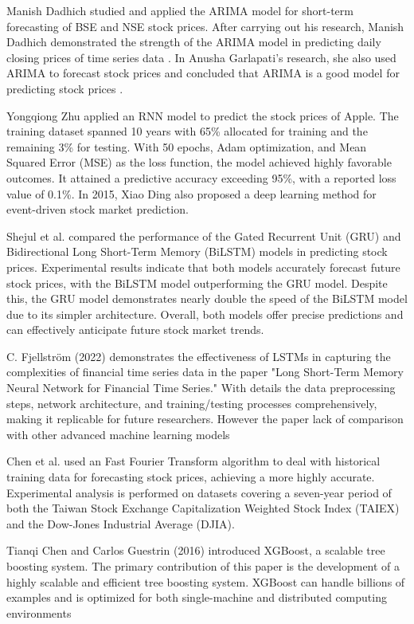 \documentclass{ieeeojies}
\begin{document}
Manish Dadhich studied and applied the ARIMA model for short-term forecasting of BSE and NSE stock prices. After carrying out his research, Manish Dadhich demonstrated the strength of the ARIMA model in predicting daily closing prices of time series data \cite{dadhich2021predictive}. In Anusha Garlapati's research, she also used ARIMA to forecast stock prices and concluded that ARIMA is a good model for predicting stock prices \cite{garlapati2021stock}.

Yongqiong Zhu \cite{ZhuRNN} applied an RNN model to predict the stock prices of Apple. The training dataset spanned 10 years with 65\% allocated for training and the remaining 3\% for testing. With 50 epochs, Adam optimization, and Mean Squared Error (MSE) as the loss function, the model achieved highly favorable outcomes. It attained a predictive accuracy exceeding 95\%, with a reported loss value of 0.1\%. In 2015, Xiao Ding \cite{DingGRU} also proposed a deep learning method for event-driven stock market prediction.

Shejul et al. \cite{ShejulGRU} compared the performance of the Gated Recurrent Unit (GRU) and Bidirectional Long Short-Term Memory (BiLSTM) models in predicting stock prices. Experimental results indicate that both models accurately forecast future stock prices, with the BiLSTM model outperforming the GRU model. Despite this, the GRU model demonstrates nearly double the speed of the BiLSTM model due to its simpler architecture. Overall, both models offer precise predictions and can effectively anticipate future stock market trends.

C. Fjellström (2022) \cite{fjellstrom2022lstm} demonstrates the effectiveness of LSTMs in capturing the complexities of financial time series data in the paper "Long Short-Term Memory Neural Network for Financial Time Series." With details the data preprocessing steps, network architecture, and training/testing processes comprehensively, making it replicable for future researchers. However the paper lack of comparison with other advanced machine learning models

Chen et al.\cite{ChenFFT} used an Fast Fourier Transform algorithm to deal with historical training data for forecasting stock prices, achieving a more highly accurate. Experimental analysis is performed on datasets covering a seven-year period of both the Taiwan Stock Exchange Capitalization Weighted Stock Index (TAIEX) and the Dow-Jones Industrial Average (DJIA). 

Tianqi Chen and Carlos Guestrin (2016)\cite{chen2016xgboost} introduced XGBoost, a scalable tree boosting system. The primary contribution of this paper is the development of a highly scalable and efficient tree boosting system. XGBoost can handle billions of examples and is optimized for both single-machine and distributed computing environments
\end{document}
